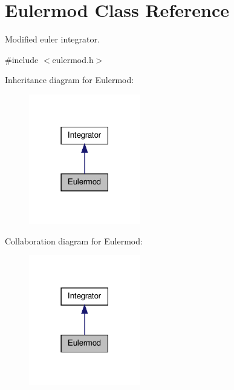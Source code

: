 \hypertarget{classEulermod}{\section{\-Eulermod \-Class \-Reference}
\label{classEulermod}
}


\-Modified euler integrator.  




{\ttfamily \#include $<$eulermod.\-h$>$}



\-Inheritance diagram for \-Eulermod\-:\nopagebreak
\begin{figure}[H]
\begin{center}
\leavevmode
\includegraphics[width=138pt]{classEulermod__inherit__graph}
\end{center}
\end{figure}


\-Collaboration diagram for \-Eulermod\-:\nopagebreak
\begin{figure}[H]
\begin{center}
\leavevmode
\includegraphics[width=138pt]{classEulermod__coll__graph}
\end{center}
\end{figure}
